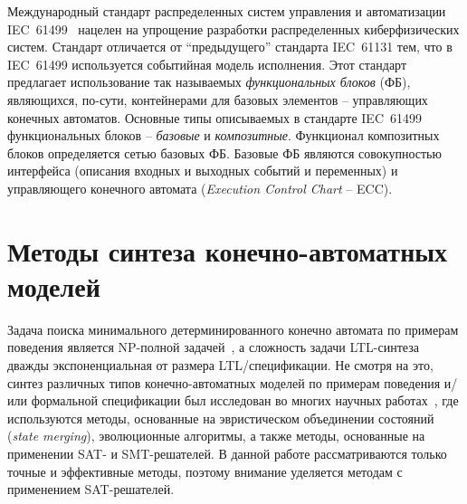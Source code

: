 
Международный стандарт распределенных систем управления и автоматизации IEC~61499~\cite{vyatkin-tii} нацелен на упрощение разработки распределенных киберфизических систем.
Стандарт отличается от \enquote{предыдущего} стандарта IEC~61131\cite{iec-61131} тем, что в IEC~61499 используется событийная модель исполнения.
Этот стандарт предлагает использование так называемых \textit{функциональных блоков} (ФБ), являющихся, по-сути, контейнерами для базовых элементов \--- управляющих конечных автоматов.
Основные типы описываемых в стандарте IEC~61499 функциональных блоков \--- \textit{базовые} и \textit{композитные}.
Функционал композитных блоков определяется сетью базовых ФБ.
Базовые ФБ являются совокупностью интерфейса (описания входных и выходных событий и переменных) и управляющего конечного автомата (\textit{Execution Control Chart} \--- ECC).



\section{Методы синтеза конечно-автоматных моделей}
\label{sub:automata-synthesis}


Задача поиска минимального детерминированного конечно автомата по примерам поведения является NP-полной задачей~\cite{gold}, а сложность задачи LTL-синтеза дважды экспоненциальная от размера LTL\-/спецификации.
Не смотря на это, синтез различных типов конечно-автоматных моделей по примерам поведения и/или формальной спецификации был исследован во многих научных работах~\cite{heule2010,efsm-tools,zakirzyanov2019,buzhinsky-tii,bosy,tsarev-egorov-gecco,giantamidis-tripakis,petrenko,petrenko2,neider,g4ltl-st,smetsers-lata}, где используются методы, основанные на эвристическом объединении состояний (\textit{state merging}), эволюционные алгоритмы, а также методы, основанные на применении SAT- и SMT-решателей.
В данной работе рассматриваются только точные и эффективные методы, поэтому внимание уделяется методам с применением SAT-решателей.


